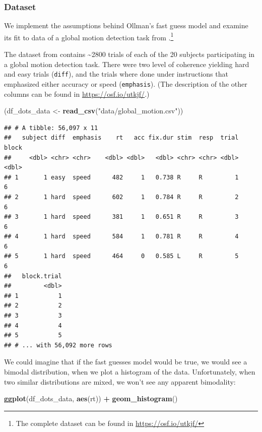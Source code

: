 \documentclass[12pt,]{krantz}
\newenvironment{Shaded}{\begin{snugshade}}{\end{snugshade}}
\newcommand{\KeywordTok}[1]{\textcolor[rgb]{0.13,0.29,0.53}{\textbf{#1}}}
\newcommand{\NormalTok}[1]{#1}
\newcommand{\OperatorTok}[1]{\textcolor[rgb]{0.81,0.36,0.00}{\textbf{#1}}}
\newcommand{\StringTok}[1]{\textcolor[rgb]{0.31,0.60,0.02}{#1}}
\theoremstyle{definition}
\theoremstyle{definition}
\theoremstyle{definition}
\theoremstyle{remark}
\begin{document}
\hypertarget{dataset}{%
\subsubsection{Dataset}\label{dataset}}

We implement the assumptions behind Ollman's fast guess model and examine its fit to data of a global motion detection task from \citet{Dutilh2019quality}.\footnote{The complete dataset can be found in \url{https://osf.io/utkjf/}}

The dataset from \citet{Dutilh2019quality} contains \textasciitilde{}2800 trials of each of the 20 subjects participating in a global motion detection task. There were two level of coherence yielding hard and easy trials (\texttt{diff}), and the trials where done under instructions that emphasized either accuracy or speed (\texttt{emphasis}). (The description of the other columns can be found in \url{https://osf.io/utkjf/}.)

\begin{Shaded}
\begin{Highlighting}[]
\NormalTok{(df_dots_data <-}\StringTok{ }\KeywordTok{read_csv}\NormalTok{(}\StringTok{"data/global_motion.csv"}\NormalTok{))}
\end{Highlighting}
\end{Shaded}

\begin{verbatim}
## # A tibble: 56,097 x 11
##   subject diff  emphasis    rt   acc fix.dur stim  resp  trial block
##     <dbl> <chr> <chr>    <dbl> <dbl>   <dbl> <chr> <chr> <dbl> <dbl>
## 1       1 easy  speed      482     1   0.738 R     R         1     6
## 2       1 hard  speed      602     1   0.784 R     R         2     6
## 3       1 hard  speed      381     1   0.651 R     R         3     6
## 4       1 hard  speed      584     1   0.781 R     R         4     6
## 5       1 hard  speed      464     0   0.585 L     R         5     6
##   block.trial
##         <dbl>
## 1           1
## 2           2
## 3           3
## 4           4
## 5           5
## # ... with 56,092 more rows
\end{verbatim}

We could imagine that if the fast guesses model would be true, we would see a bimodal distribution, when we plot a histogram of the data. Unfortunately, when two similar distributions are mixed, we won't see any apparent bimodality:

\begin{Shaded}
\begin{Highlighting}[]
\KeywordTok{ggplot}\NormalTok{(df_dots_data, }\KeywordTok{aes}\NormalTok{(rt)) }\OperatorTok{+}
\StringTok{  }\KeywordTok{geom_histogram}\NormalTok{()}
\end{Highlighting}
\end{Shaded}
\end{document}
